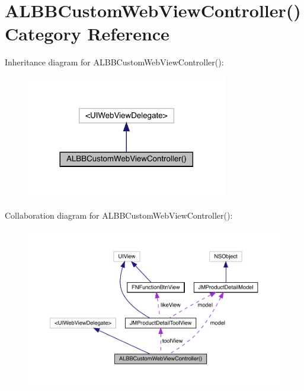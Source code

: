 \hypertarget{category_a_l_b_b_custom_web_view_controller_07_08}{}\section{A\+L\+B\+B\+Custom\+Web\+View\+Controller() Category Reference}
\label{category_a_l_b_b_custom_web_view_controller_07_08}


Inheritance diagram for A\+L\+B\+B\+Custom\+Web\+View\+Controller()\+:\nopagebreak
\begin{figure}[H]
\begin{center}
\leavevmode
\includegraphics[width=248pt]{category_a_l_b_b_custom_web_view_controller_07_08__inherit__graph}
\end{center}
\end{figure}


Collaboration diagram for A\+L\+B\+B\+Custom\+Web\+View\+Controller()\+:\nopagebreak
\begin{figure}[H]
\begin{center}
\leavevmode
\includegraphics[width=350pt]{category_a_l_b_b_custom_web_view_controller_07_08__coll__graph}
\end{center}
\end{figure}
